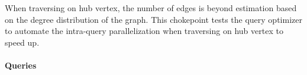 
When traversing on hub vertex, the number of edges is beyond estimation based on the degree distribution of the graph. This chokepoint tests the query optimizer to automate the intra-query parallelization when traversing on hub vertex to speed up.


\paragraph{Queries}
{\raggedright

}